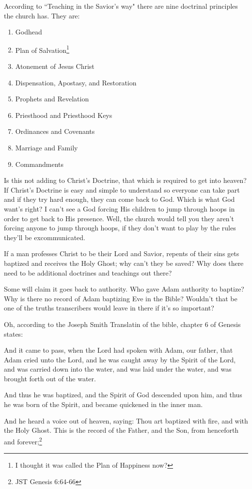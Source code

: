 According to ``Teaching in the Savior's way" there are nine doctrinal principles the
church has. They are:

\begin{enumerate}
  \item Godhead
  \item Plan of Salvation\footnote{I thought it was called the Plan of Happiness now?}
  \item Atonement of Jesus Christ
  \item Dispensation, Apostasy, and Restoration
  \item Prophets and Revelation
  \item Priesthood and Priesthood Keys
  \item Ordinances and Covenants
  \item Marriage and Family
  \item Commandments
\end{enumerate}

Is this not adding to Christ's Doctrine, that which is required to get into heaven?
If Christ's Doctrine is easy and simple to understand so everyone can take part and
if they try hard enough, they can come back to God. Which is what God want's right? I
can't see a God forcing His children to jump through hoops in order to get back to
His presence. Well, the church would tell you they aren't forcing anyone to jump
through hoops, if they don't want to play by the rules they'll be excommunicated.

If a man professes Christ to be their Lord and Savior, repents of their sins gets 
baptized and receives the Holy Ghost; why can't they be saved? Why does there need to
be additional doctrines and teachings out there?

Some will claim it goes back to authority. Who gave Adam authority to baptize? Why is
there no record of Adam baptizing Eve in the Bible? Wouldn't that be one of the
truths transcribers would leave in there if it's so important?

Oh, according to the Joseph Smith Translatin of the bible, chapter 6 of Genesis
states:

\begin{displayquote}
And it came to pass, when the Lord had spoken with Adam, our father, that Adam 
cried unto the Lord, and he was caught away by the Spirit of the Lord, and was 
carried down into the water, and was laid under the water, and was brought forth 
out of the water.

And thus he was baptized, and the Spirit of God descended upon him, and thus he 
was born of the Spirit, and became quickened in the inner man.

And he heard a voice out of heaven, saying: Thou art baptized with fire, and with 
the Holy Ghost. This is the record of the Father, and the Son, 
from henceforth and forever;\footnote{JST Genesis 6:64-66}
\end{displayquote}

